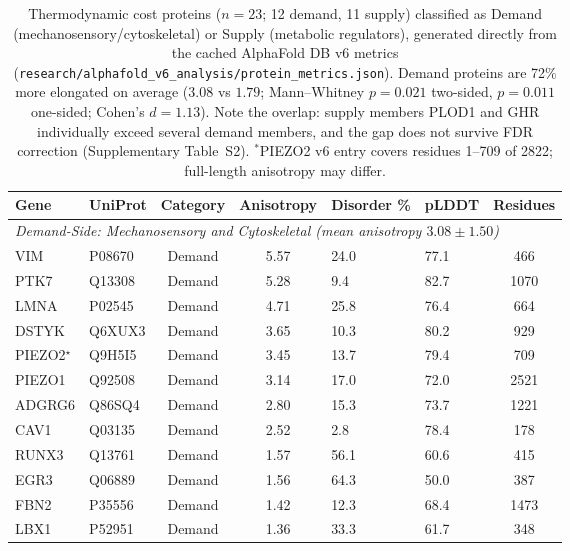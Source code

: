 \begin{table}[h!]
\centering
\caption{Thermodynamic cost proteins ($n=23$; 12 demand, 11 supply) classified as Demand (mechanosensory/cytoskeletal) or Supply (metabolic regulators), generated directly from the cached AlphaFold DB v6 metrics (\texttt{research/alphafold\_v6\_analysis/protein\_metrics.json}). Demand proteins are 72\% more elongated on average ($3.08$ vs $1.79$; Mann--Whitney $p = 0.021$ two-sided, $p = 0.011$ one-sided; Cohen's $d = 1.13$). Note the overlap: supply members PLOD1 and GHR individually exceed several demand members, and the gap does not survive FDR correction (Supplementary Table~S2). $^*$PIEZO2 v6 entry covers residues 1--709 of 2822; full-length anisotropy may differ.}
\label{tab:thermodynamic_cost_proteins}
\scriptsize
\begin{tabular}{llccllc}
\toprule
\textbf{Gene} & \textbf{UniProt} & \textbf{Category} & \textbf{Anisotropy} & \textbf{Disorder \%} & \textbf{pLDDT} & \textbf{Residues} \\
\midrule
\multicolumn{7}{l}{\textit{Demand-Side: Mechanosensory and Cytoskeletal (mean anisotropy $3.08 \pm 1.50$)}} \\
VIM & P08670 & Demand & 5.57 & 24.0 & 77.1 & 466 \\
PTK7 & Q13308 & Demand & 5.28 & 9.4 & 82.7 & 1070 \\
LMNA & P02545 & Demand & 4.71 & 25.8 & 76.4 & 664 \\
DSTYK & Q6XUX3 & Demand & 3.65 & 10.3 & 80.2 & 929 \\
PIEZO2$^{\star}$ & Q9H5I5 & Demand & 3.45 & 13.7 & 79.4 & 709 \\
PIEZO1 & Q92508 & Demand & 3.14 & 17.0 & 72.0 & 2521 \\
ADGRG6 & Q86SQ4 & Demand & 2.80 & 15.3 & 73.7 & 1221 \\
CAV1 & Q03135 & Demand & 2.52 & 2.8 & 78.4 & 178 \\
RUNX3 & Q13761 & Demand & 1.57 & 56.1 & 60.6 & 415 \\
EGR3 & Q06889 & Demand & 1.56 & 64.3 & 50.0 & 387 \\
FBN2 & P35556 & Demand & 1.42 & 12.3 & 68.4 & 1473 \\
LBX1 & P52951 & Demand & 1.36 & 33.3 & 61.7 & 348 \\

\end{tabular}
\end{table}
